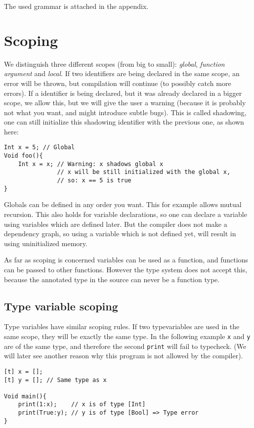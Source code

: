 \documentclass[14pt]{amsart}
\begin{document}
The used grammar is attached in the appendix.

\section{Scoping}
We distinguish three different scopes (from big to small): \emph{global}, \emph{function argument} and \emph{local}. If two identifiers are being declared in the same scope, an error will be thrown, but compilation will continue (to possibly catch more errors). If a identifier is being declared, but it was already declared in a bigger scope, we allow this, but we will give the user a warning (because it is probably not what you want, and might introduce subtle bugs). This is called shadowing, one can still initialize this shadowing identifier with the previous one, as shown here:

\begin{lstlisting}
Int x = 5; // Global
Void foo(){
    Int x = x; // Warning: x shadows global x
               // x will be still initialized with the global x,
               // so: x == 5 is true
}
\end{lstlisting}

Globals can be defined in any order you want. This for example allows mutual recursion. This also holds for variable declarations, so one can declare a variable using variables which are defined later. But the compiler does not make a dependency graph, so using a variable which is not defined yet, will result in using uninitialized memory.

As far as scoping is concerned variables can be used as a function, and functions can be passed to other functions. However the type system does not accept this, because the annotated type in the source can never be a function type.

\subsection{Type variable scoping}
Type variables have similar scoping rules. If two typevariables are used in the same scope, they will be exactly the same type. In the following example \texttt{x} and \texttt{y} are of the same type, and therefore the second \texttt{print} will fail to typecheck. (We will later see another reason why this program is not allowed by the compiler).

\begin{lstlisting}
[t] x = [];
[t] y = []; // Same type as x

Void main(){
	print(1:x);    // x is of type [Int]
	print(True:y); // y is of type [Bool] => Type error
}
\end{lstlisting}
\end{document}

